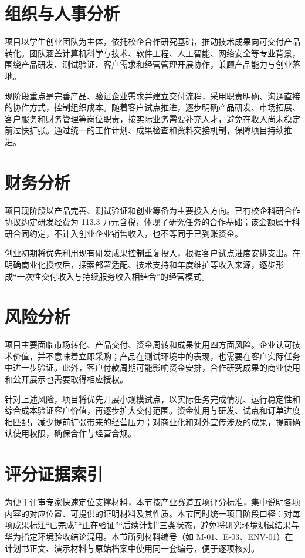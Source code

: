 \section{组织与人事分析}\label{sec:1.6}
项目以学生创业团队为主体，依托校企合作研究基础，推动技术成果向可交付产品转化。团队涵盖计算机科学与技术、软件工程、人工智能、网络安全等专业背景，围绕产品研发、测试验证、客户需求和经营管理开展协作，兼顾产品能力与创业落地。

现阶段重点是完善产品、验证企业需求并建立交付流程，采用职责明确、沟通直接的协作方式，控制组织成本。随着客户试点推进，逐步明确产品研发、市场拓展、客户服务和财务管理等岗位职责，按实际业务需要补充人才，避免在收入尚未稳定前过快扩张。通过统一的工作计划、成果检查和资料交接机制，保障项目持续推进。

\section{财务分析}\label{sec:1.7}
项目现阶段以产品完善、测试验证和创业筹备为主要投入方向。已有校企科研合作协议约定研发经费为 113.3 万元含税，体现了研究任务的合作基础；该金额属于科研合同约定，不计入创业企业销售收入，也不等同于已到账资金。

创业初期将优先利用现有研发成果控制重复投入，根据客户试点进度安排支出。在明确商业化授权后，探索部署适配、技术支持和年度维护等收入来源，逐步形成“一次性交付收入与持续服务收入相结合”的经营模式。

\section{风险分析}\label{sec:1.8}
项目主要面临市场转化、产品交付、资金周转和成果使用四方面风险。企业认可技术价值，并不意味着立即采购；产品在测试环境中的表现，也需要在客户实际任务中进一步验证。此外，客户付款周期可能影响资金安排，合作研究成果的商业使用和公开展示也需要取得相应授权。

针对上述风险，项目将优先开展小规模试点，以实际任务完成情况、运行稳定性和综合成本验证客户价值，再逐步扩大交付范围。资金使用与研发、试点和订单进度相匹配，减少提前扩张带来的经营压力；对商业化和对外宣传涉及的成果，提前确认使用权限，确保合作与经营合规。

\section{评分证据索引}\label{sec:1.9}
为便于评审专家快速定位支撑材料，本节按产业赛道五项评分标准，集中说明各项内容的对应位置、可提供的证明材料及其性质。本节同时统一项目阶段口径：对每项成果标注“已完成”“正在验证”“后续计划”三类状态，避免将研究环境测试结果与华为指定环境验收结论混用。本节所列材料编号（如 M-01、E-03、ENV-01）在计划书正文、演示材料与原始档案中使用同一套编号，便于逐项核对。

